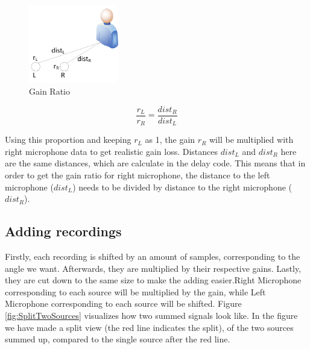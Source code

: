 \begin{figure}[htp]
	\centering
	\includegraphics[width=0.35\textwidth]{Illustrations/gainRatio.jpg}
	\caption{Gain Ratio}
	\label{fig:ratioDependence}
\end{figure}
\begin{equation}
	\frac{r_L}{r_R} = \frac{dist_R}{dist_L}
\end{equation}
 
Using this proportion and keeping \(r_L\) as 1, the gain \(r_R\) will be multiplied 
with right microphone data to get realistic gain loss. Distances \(dist_L\) and 
\(dist_R\) here are the same distances, which are calculate in the delay code. This 
means that in order to get the gain ratio for right microphone, the distance to the 
left microphone (\(dist_L\)) needs to be divided by distance to the right 
microphone (\(dist_R\)).
\newpage
\subsection*{Adding recordings}
Firstly, each recording is shifted by an amount of samples, corresponding to the 
angle we want. Afterwards, they are multiplied by their respective gains. Lastly, 
they are cut down to the same size to make the adding easier.Right Microphone 
corresponding to each source will be multiplied by the gain, while Left Microphone  
corresponding to each source will be shifted. Figure \ref{fig:SplitTwoSources} 
visualizes how two summed signals look like. In the figure we have made a split  
view (the red line indicates the split), of the two sources summed up, compared to the 
single source after the red line. 

